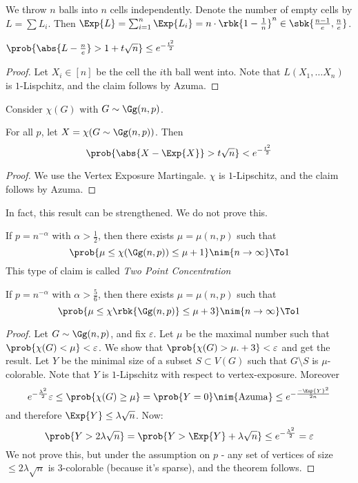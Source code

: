 \documentclass[a4paper, 11pt, oneside]{book}
\begin{document}
\begin{example}
	We throw $n$ balls into $n$ cells independently. Denote the number of empty cells by $L = \sum L_i$. Then $\Exp{L} = \sum_{i=1}^n \Exp{L_i} = n\cdot\rbk{1-\frac{1}{n}}^n \in \sbk{\frac{n-1}{e},\frac{n}{e}}$.
	\begin{claim}
		$\prob{\abs{L - \frac{n}{e}} > 1+t\sqrt{n}}\le e^{-\frac{t^2}{2}}$
	\end{claim}
	\begin{proof}
		Let $X_i\in [n]$ be the cell the $i$th ball went into. Note that $L(X_1,\ldots X_n)$ is $1$-Lispchitz, and the claim follows by Azuma.
	\end{proof}
\end{example}

\begin{example}
	Consider $\chi(G)$ with $G\sim \Gg(n,p)$.
	\begin{claim}
		For all $p$, let $X = \chi(G\sim \Gg(n,p))$. Then
		\[
		\prob{\abs{X - \Exp{X}} > t\sqrt{n}} < e^{-\frac{t^2}{2}}
		\]
	\end{claim}
	\begin{proof}
		We use the Vertex Exposure Martingale. $\chi$ is $1$-Lipschitz, and the claim follows by Azuma.
	\end{proof}
	In fact, this result can be strengthened. We do not prove this.
	\begin{claim}
		If $p = n^{-\alpha}$ with $\alpha > \frac{1}{2}$, then there exists $\mu = \mu(n,p)$ such that
		\[
		\prob{\mu \le \chi(\Gg(n,p)) \le \mu + 1}\nim{n\to\infty}\To 1
		\]
		This type of claim is called \emph{Two Point Concentration}
	\end{claim}
	\begin{claim}
		[Relaxation]
		If $p = n^{-\alpha}$ with $\alpha > \frac{5}{6}$, then there exists $\mu = \mu(n,p)$ such that
		\[
		\prob{\mu \le \chi\rbk{\Gg(n,p)} \le \mu + 3}\nim{n\to\infty}\To 1
		\]
	\end{claim}
	\begin{proof}
		Let $G\sim \Gg(n,p)$, and fix $\varepsilon$. Let $\mu$ be the maximal number such that $\prob{\chi(G) < \mu} < \varepsilon$. We show that $\prob{\chi(G) > \mu. +3} < \varepsilon$ and get the result. Let $Y$ be the minimal size of a subset $S\subset V(G)$ such that $G\setminus S$ is $\mu$-colorable. Note that $Y$ is $1$-Lipschitz with respect to vertex-exposure. Moreover
		\[
		e^{-\frac{\lambda^2}{2}}\varepsilon \le \prob{\chi(G) \ge \mu} = \prob{Y = 0} \nim{\mathrm{Azuma}}\le e^{-\frac{-\Exp{Y}^2}{2n}}
		\]
		and therefore $\Exp{Y} \le \lambda\sqrt{n}$. Now:
		\[
		\prob{Y >  2\lambda\sqrt{n}} = \prob{Y > \Exp{Y} + \lambda\sqrt{n}}\le e^{-\frac{\lambda^2}{2}} = \varepsilon
		\]
		We not prove this, but under the assumption on $p$ - any set of vertices of size $\le 2\lambda\sqrt{n}$ is $3$-colorable (because it's sparse), and the theorem follows.
	\end{proof}
\end{example}
\end{document}
